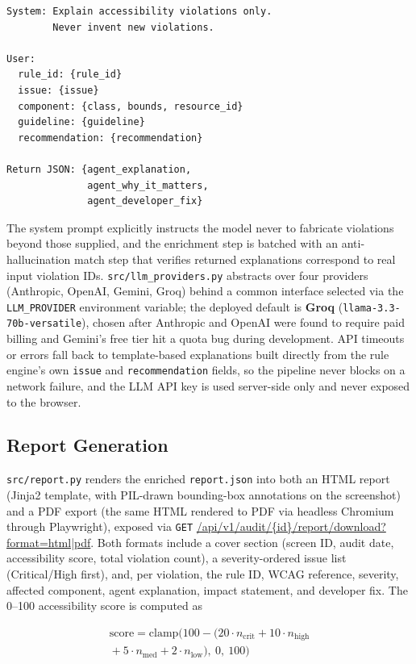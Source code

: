 \documentclass[10pt,conference]{IEEEtran}
\begin{document}
\begin{lstlisting}[style=jsonstyle, caption={Per-violation agent prompt template.}, label={lst:prompt}]
System: Explain accessibility violations only.
        Never invent new violations.

User:
  rule_id: {rule_id}
  issue: {issue}
  component: {class, bounds, resource_id}
  guideline: {guideline}
  recommendation: {recommendation}

Return JSON: {agent_explanation,
              agent_why_it_matters,
              agent_developer_fix}
\end{lstlisting}

The system prompt explicitly instructs the model never to fabricate violations beyond those supplied, and the enrichment step is batched with an anti-hallucination match step that verifies returned explanations correspond to real input violation IDs. \texttt{src/llm\_providers.py} abstracts over four providers (Anthropic, OpenAI, Gemini, Groq) behind a common interface selected via the \texttt{LLM\_PROVIDER} environment variable; the deployed default is \textbf{Groq} (\texttt{llama-3.3-70b-versatile}), chosen after Anthropic and OpenAI were found to require paid billing and Gemini's free tier hit a quota bug during development. API timeouts or errors fall back to template-based explanations built directly from the rule engine's own \texttt{issue} and \texttt{recommendation} fields, so the pipeline never blocks on a network failure, and the LLM API key is used server-side only and never exposed to the browser.

\subsection{Report Generation}
\texttt{src/report.py} renders the enriched \texttt{report.json} into both an HTML report (Jinja2 template, with PIL-drawn bounding-box annotations on the screenshot) and a PDF export (the same HTML rendered to PDF via headless Chromium through Playwright), exposed via \texttt{GET} \url{/api/v1/audit/{id}/report/download?format=html|pdf}. Both formats include a cover section (screen ID, audit date, accessibility score, total violation count), a severity-ordered issue list (Critical/High first), and, per violation, the rule ID, WCAG reference, severity, affected component, agent explanation, impact statement, and developer fix. The 0--100 accessibility score is computed as

\begin{equation}
\begin{aligned}
\text{score} = \text{clamp}\big(100 - (20 \cdot n_{\text{crit}} + 10 \cdot n_{\text{high}} \\
{} + 5 \cdot n_{\text{med}} + 2 \cdot n_{\text{low}}),\ 0,\ 100\big)
\end{aligned}
\label{eq:score}
\end{equation}
\end{document}

